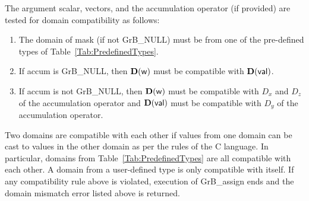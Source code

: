 The argument scalar, vectors, and the accumulation 
operator (if provided) are tested for domain compatibility as follows:
\begin{enumerate}
	\item The domain of {\sf mask} (if not {\sf GrB\_NULL}) must be from one of 
    the pre-defined types of Table~\ref{Tab:PredefinedTypes}.

	\item If {\sf accum} is {\sf GrB\_NULL}, then $\bold{D}({\sf w})$ must be 
    compatible with $\bold{D}({\sf val})$.

	\item If {\sf accum} is not {\sf GrB\_NULL}, then $\bold{D}({\sf w})$ must be
    compatible with $D_x$ and $D_z$ of the accumulation operator and 
    $\bold{D}({\sf val})$ must be compatible with $D_y$ of the accumulation operator.
\end{enumerate}
Two domains are compatible with each other if values from one domain can be cast 
to values in the other domain as per the rules of the C language.
In particular, domains from Table~\ref{Tab:PredefinedTypes} are all compatible 
with each other. A domain from a user-defined type is only compatible with itself.
If any compatibility rule above is violated, execution of {\sf GrB\_assign} ends
and the domain mismatch error listed above is returned.

